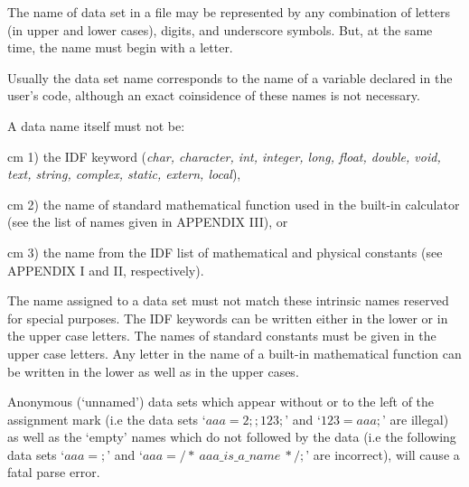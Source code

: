 The name of data set in a file may be represented by any combination
of letters (in upper and lower cases), digits, and underscore symbols.
But, at the same time, the name must begin with a letter.

Usually the data set name corresponds to the name of a variable declared
in the user's code, although an exact coinsidence of these names
is not necessary.

A data name itself must not be:

{
{ cm}
1) the IDF keyword ({\it char, character, int, integer, long, float,
double, void, text, string, complex, static, extern, local}),
}

{
{ cm}
2) the name of standard mathematical function used in the built-in
calculator (see the list of names given in APPENDIX III), or 
}

{
{ cm}
3) the name from the IDF list of mathematical and physical constants 
(see APPENDIX I and II, respectively).
}

The name assigned to a data set must not match these intrinsic names reserved
for special purposes. 
The IDF keywords can be written 
either in the lower or in the upper case letters.
The names of standard constants must be given in the upper case letters.
Any letter in the name of a built-in mathematical function
can be written in the lower as well as in the upper cases.

Anonymous (`unnamed') data sets which appear without or to the left 
of the assignment mark
(i.e the data sets `$aaa=2;;123;$' and `$123=aaa;$' are illegal)
as well as the `empty' names which do not followed by the data
(i.e the following data sets `$aaa=;$' and `$aaa = /*\ aaa\_is\_a\_name\ */;$'
are incorrect), will cause a fatal parse error.



